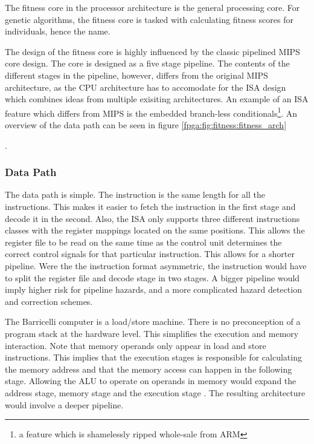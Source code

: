 The fitness core in the processor architecture is the general processing core.
For genetic algorithms, the fitness core is tasked with calculating fitness scores for individuals, hence the name.

The design of the fitness core is highly influenced by the classic pipelined \gls{MIPS} core design\cn.
The core is designed as a five stage pipeline.
The contents of the different stages in the pipeline, however, differs from the original \gls{MIPS} architecture, as the CPU architecture has to accomodate for the \gls{ISA} design which combines ideas from multiple exisiting architectures.
An example of an \gls{ISA} feature which differs from \gls{MIPS} is the embedded branch-less conditionals\footnote{a feature which is shamelessly ripped whole-sale from ARM}.
An overview of the data path can be seen in figure \vref{fpga:fig:fitness:fitness_arch}

.

\subsubsection{Data Path} 

The data path is simple.
The instruction is the same length for all the instructions.
This makes it easier to fetch the instruction in the first stage and decode it in the second.
Also, the ISA only supports three different instructions classes with the register mappings located on the same positions.
This allows the register file to be read on the same time as the control unit determines the correct control signals for that particular instruction.
This allows for a shorter pipeline.
Were the the instruction format asymmetric, the instruction would have to split the register file and decode stage in two stages.
A bigger pipeline would imply higher risk for pipeline hazards, and a more complicated hazard detection and correction schemes. 

The Barricelli computer is a load/store machine.
There is no preconception of a program stack at the hardware level.
This simplifies the execution and memory interaction.
Note that memory operands only appear in load and store instructions.
This implies that the execution stages is responsible for calculating the memory address and that the memory access can happen in the following stage.
Allowing the ALU to operate on operands in memory would expand the address stage, memory stage and the execution stage \cite[p.~335]{compOrgDes}.
The resulting architecture would involve a deeper pipeline. 


